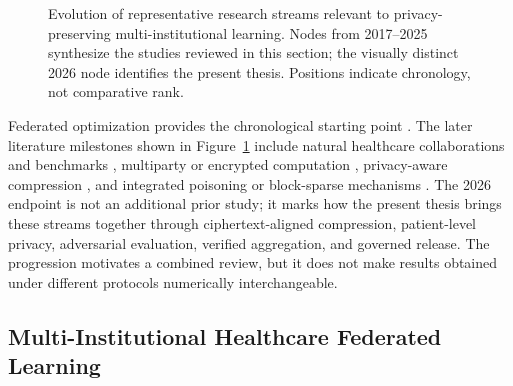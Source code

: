 \begin{figure}[htbp]
{%
}
\caption{Evolution of representative research streams relevant to privacy-preserving multi-institutional learning. Nodes from 2017--2025 synthesize the studies reviewed in this section; the visually distinct 2026 node identifies the present thesis. Positions indicate chronology, not comparative rank.}
\label{fig:related-work-timeline}
\end{figure}

Federated optimization provides the chronological starting point \cite{mcmahan2017fedavg}. The later literature milestones shown in Figure~\ref{fig:related-work-timeline} include natural healthcare collaborations and benchmarks \cite{sheller2020federated,dayan2021federated,ogier2022flamby}, multiparty or encrypted computation \cite{froelicher2021famh,sav2021poseidon,stevens2022fldp}, privacy-aware compression \cite{li2022soteriafl,li2023fedef}, and integrated poisoning or block-sparse mechanisms \cite{xu2024ddfed,gu2025dpbrem,asi2025preamble}. The 2026 endpoint is not an additional prior study; it marks how the present thesis brings these streams together through ciphertext-aligned compression, patient-level privacy, adversarial evaluation, verified aggregation, and governed release. The progression motivates a combined review, but it does not make results obtained under different protocols numerically interchangeable.

\subsection{Multi-Institutional Healthcare Federated Learning}

